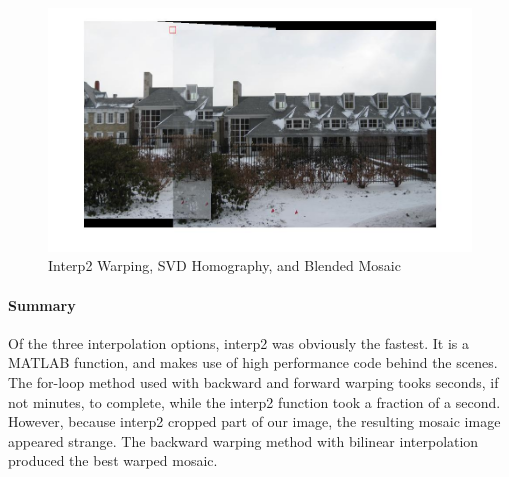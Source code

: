 \documentclass[11pt, letterpaper]{article}
\begin{document}
\begin{figure}[here]
\includegraphics[width=\textwidth]{../pics/snow-svd-interp2-blended.jpg}
\caption{Interp2 Warping, SVD Homography, and Blended Mosaic}
\label{fig:interp2Warping}
\end{figure}

\paragraph{Summary}
Of the three interpolation options, interp2 was obviously the
fastest. It is a MATLAB function, and makes use of high performance
code behind the scenes. The for-loop method used with backward and
forward warping tooks seconds, if not minutes, to complete, while the
interp2 function took a fraction of a second. However, because interp2
cropped part of our image, the resulting mosaic image appeared
strange. The backward warping method with bilinear interpolation
produced the best warped mosaic.
\end{document}
